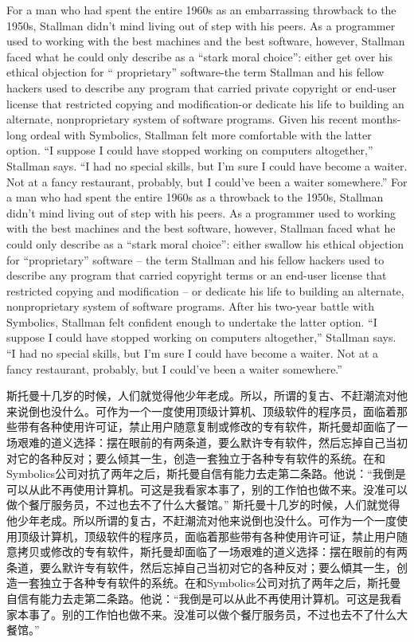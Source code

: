 \ifdefined\eng
\ifdefined\vone
For a man who had spent the entire 1960s as an embarrassing throwback to the 1950s, Stallman didn't mind living out of step with his peers. As a programmer used to working with the best machines and the best software, however, Stallman faced what he could only describe as a ``stark moral choice'': either get over his ethical objection for `` proprietary'' software-the term Stallman and his fellow hackers used to describe any program that carried private copyright or end-user license that restricted copying and modification-or dedicate his life to building an alternate, nonproprietary system of software programs. Given his recent months-long ordeal with Symbolics, Stallman felt more comfortable with the latter option. ``I suppose I could have stopped working on computers altogether,'' Stallman says. ``I had no special skills, but I'm sure I could have become a waiter. Not at a fancy restaurant, probably, but I could've been a waiter somewhere.''
\fi
\ifdefined\vtwo
For a man who had spent the entire 1960s as a throwback to the 1950s, Stallman didn't mind living out of step with his peers. As a programmer used to working with the best machines and the best software, however, Stallman faced what he could only describe as a ``stark moral choice'': either swallow his ethical objection for ``proprietary'' software -- the term Stallman and his fellow hackers used to describe any program that carried copyright terms or an end-user license that restricted copying and modification -- or dedicate his life to building an alternate, nonproprietary system of software programs. After his two-year battle with Symbolics, Stallman felt confident enough to undertake the latter option. ``I suppose I could have stopped working on computers altogether,'' Stallman says. ``I had no special skills, but I'm sure I could have become a waiter. Not at a fancy restaurant, probably, but I could've been a waiter somewhere.''
\fi
\fi

\ifdefined\chs
\ifdefined\vone
斯托曼十几岁的时候，人们就觉得他少年老成。所以，所谓的复古、不赶潮流对他来说倒也没什么。可作为一个一度使用顶级计算机、顶级软件的程序员，面临着那些带有各种使用许可证，禁止用户随意复制或修改的专有软件，斯托曼却面临了一场艰难的道义选择：摆在眼前的有两条道，要么默许专有软件，然后忘掉自己当初对它的各种反对；要么倾其一生，创造一套独立于各种专有软件的系统。在和Symbolics公司对抗了两年之后，斯托曼自信有能力去走第二条路。他说：``我倒是可以从此不再使用计算机。可这是我看家本事了，别的工作怕也做不来。没准可以做个餐厅服务员，不过也去不了什么大餐馆。''
\fi
\ifdefined\vtwo
斯托曼十几岁的时候，人们就觉得他少年老成。所以所谓的复古，不赶潮流对他来说倒也没什么。可作为一个一度使用顶级计算机，顶级软件的程序员，面临着那些带有各种使用许可证，禁止用户随意拷贝或修改的专有软件，斯托曼却面临了一场艰难的道义选择：摆在眼前的有两条道，要么默许专有软件，然后忘掉自己当初对它的各种反对；要么傾其一生，创造一套独立于各种专有软件的系统。在和Symbolics公司对抗了两年之后，斯托曼自信有能力去走第二条路。他说：``我倒是可以从此不再使用计算机。可这是我看家本事了。别的工作怕也做不来。没准可以做个餐厅服务员，不过也去不了什么大餐馆。''
\fi
\fi

